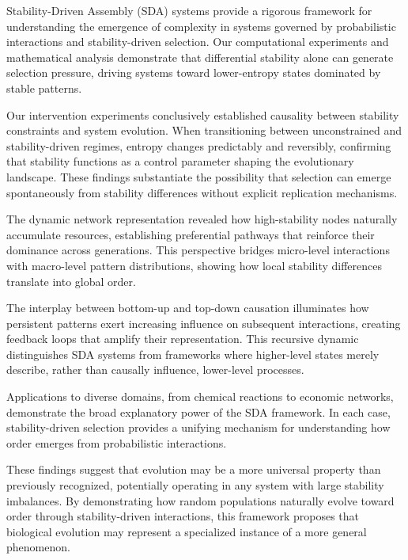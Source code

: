 \documentclass[preprint,12pt]{elsarticle}
\begin{document}
Stability-Driven Assembly (SDA) systems provide a rigorous framework for understanding the emergence of complexity in systems governed by probabilistic interactions and stability-driven selection. Our computational experiments and mathematical analysis demonstrate that differential stability alone can generate selection pressure, driving systems toward lower-entropy states dominated by stable patterns.

Our intervention experiments conclusively established causality between stability constraints and system evolution. When transitioning between unconstrained and stability-driven regimes, entropy changes predictably and reversibly, confirming that stability functions as a control parameter shaping the evolutionary landscape. These findings substantiate the possibility that selection can emerge spontaneously from stability differences without explicit replication mechanisms.

The dynamic network representation revealed how high-stability nodes naturally accumulate resources, establishing preferential pathways that reinforce their dominance across generations. This perspective bridges micro-level interactions with macro-level pattern distributions, showing how local stability differences translate into global order.

The interplay between bottom-up and top-down causation illuminates how persistent patterns exert increasing influence on subsequent interactions, creating feedback loops that amplify their representation. This recursive dynamic distinguishes SDA systems from frameworks where higher-level states merely describe, rather than causally influence, lower-level processes.

Applications to diverse domains, from chemical reactions to economic networks, demonstrate the broad explanatory power of the SDA framework. In each case, stability-driven selection provides a unifying mechanism for understanding how order emerges from probabilistic interactions.

These findings suggest that evolution may be a more universal property than previously recognized, potentially operating in any system with large stability imbalances. By demonstrating how random populations naturally evolve toward order through stability-driven interactions, this framework proposes that biological evolution may represent a specialized instance of a more general phenomenon.
\end{document}
